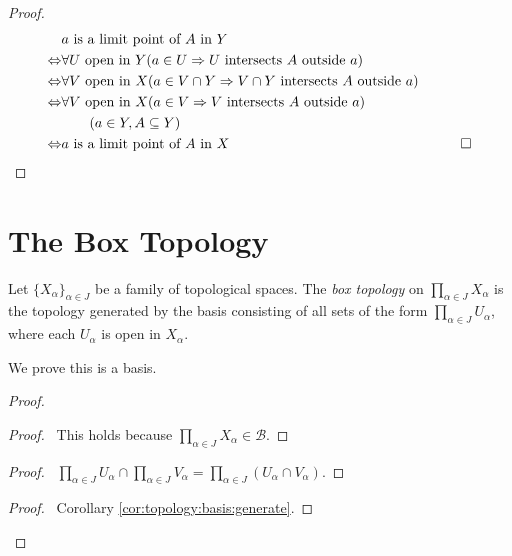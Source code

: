 \begin{proof}
  \pf
  \begin{align*}
    & a \text{ is a limit point of } A \text{ in } Y \\
    \Leftrightarrow & \forall U \text{ open in } Y( a \in U \Rightarrow U
    \text{ intersects } A \text{ outside } a) \\
    \Leftrightarrow & \forall V \text{ open in } X( a \in V \cap Y
    \Rightarrow
    V \cap Y \text{ intersects } A \text{ outside } a) \\
    \Leftrightarrow & \forall V \text{ open in } X( a \in V \Rightarrow V
    \text{ intersects } A \text{ outside } a) \\
    & \qquad (a \in Y, A \subseteq Y) \\
    \Leftrightarrow & a \text{ is a limit point of } A \text{ in } X & \qed
  \end{align*}
\end{proof}

\section{The Box Topology}

\begin{df}
  Let $\{ X_\alpha \}_{\alpha \in J}$ be a family of topological spaces. The
  \emph{box topology} on $\prod_{\alpha \in J} X_\alpha$ is the topology
  generated by the basis consisting of all sets of the form $\prod_{\alpha
    \in J} U_\alpha$, where each $U_\alpha$ is open in $X_\alpha$.

  We prove this is a basis.
\end{df}

\begin{proof}
  \pf
  \begin{proof}
    \pf\ This holds because $\prod_{\alpha \in J} X_\alpha \in \mathcal{B}$.
  \end{proof}
  \begin{proof}
    \pf\ $\prod_{\alpha \in J} U_\alpha \cap \prod_{\alpha \in J} V_\alpha =
    \prod_{\alpha \in J} (U_\alpha \cap V_\alpha)$.
  \end{proof}
  \qedstep
  \begin{proof}
    \pf\ Corollary \ref{cor:topology:basis:generate}.
  \end{proof}
\end{proof}

